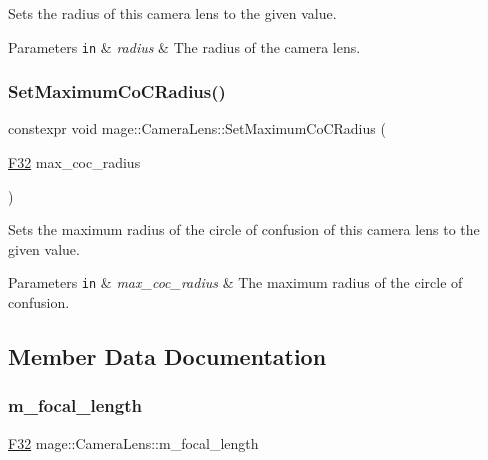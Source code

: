 Sets the radius of this camera lens to the given value.


\begin{DoxyParams}[1]{Parameters}
\mbox{\tt in}  & {\em radius} & The radius of the camera lens. \\
\hline
\end{DoxyParams}
\hypertarget{classmage_1_1_camera_lens_a9e1b123054574d0e4de775d9b7b97e48}{}\label{classmage_1_1_camera_lens_a9e1b123054574d0e4de775d9b7b97e48} 
\subsubsection{\texorpdfstring{Set\+Maximum\+Co\+C\+Radius()}{SetMaximumCoCRadius()}}
{\footnotesize\ttfamily constexpr void mage\+::\+Camera\+Lens\+::\+Set\+Maximum\+Co\+C\+Radius (\begin{DoxyParamCaption}\item[{\hyperlink{namespacemage_aa97e833b45f06d60a0a9c4fc22ae02c0}{F32}}]{max\+\_\+coc\+\_\+radius }\end{DoxyParamCaption})\hspace{0.3cm}{\ttfamily [noexcept]}}

Sets the maximum radius of the circle of confusion of this camera lens to the given value.


\begin{DoxyParams}[1]{Parameters}
\mbox{\tt in}  & {\em max\+\_\+coc\+\_\+radius} & The maximum radius of the circle of confusion. \\
\hline
\end{DoxyParams}


\subsection{Member Data Documentation}
\hypertarget{classmage_1_1_camera_lens_aa0f9753195fd3c3de2006d4bd2d6fa81}{}\label{classmage_1_1_camera_lens_aa0f9753195fd3c3de2006d4bd2d6fa81} 
\subsubsection{\texorpdfstring{m\+\_\+focal\+\_\+length}{m\_focal\_length}}
{\footnotesize\ttfamily \hyperlink{namespacemage_aa97e833b45f06d60a0a9c4fc22ae02c0}{F32} mage\+::\+Camera\+Lens\+::m\+\_\+focal\+\_\+length\hspace{0.3cm}{\ttfamily [private]}}


